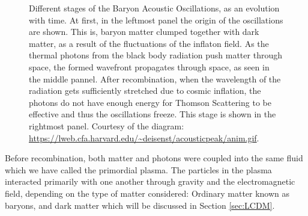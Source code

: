 \begin{figure}[t]
	\centering
	\caption[Different stages of the Baryon Acoustic Oscillations.]{Different stages of the Baryon Acoustic Oscillations, as an evolution with time. At first, in the leftmost panel the origin of the oscillations are shown. This is, baryon matter clumped together with dark matter, as a result of the fluctuations of the inflaton field. As the thermal photons from the black body radiation push matter through space, the formed wavefront propagates through space, as seen in the middle pannel. After recombination, when the wavelength of the radiation gets sufficiently stretched due to cosmic inflation, the photons do not have enough energy for Thomson Scattering to be effective and thus the oscillations freeze. This stage is shown in the rightmost panel.   Courtesy of the diagram: \url{https://lweb.cfa.harvard.edu/~deisenst/acousticpeak/anim.gif}.}
	\label{fig:scheme-BAO}
\end{figure}

Before recombination, both matter and photons were coupled into the same fluid which we have called the primordial plasma. The particles in the plasma interacted primarily with one another through gravity and the electromagnetic field, depending on the type of matter considered: Ordinary matter known as baryons, and dark matter which will be discussed in Section \ref{sec:LCDM}. \\

